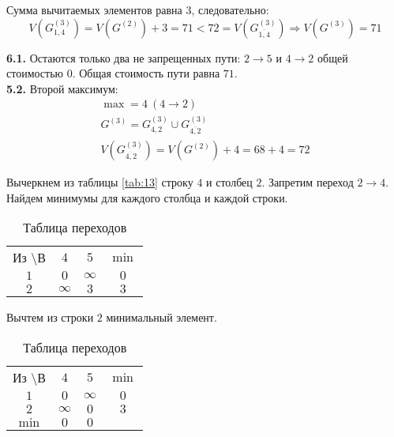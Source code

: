 Сумма вычитаемых элементов равна $3$, следовательно:
\begin{equation*}
V(G_{1,4}^{(3)}) = V(G^{(2)}) + 3 = 71 < 72 = V(G_{\overline{1,4}}^{(3)}) \Rightarrow V(G^{(3)}) = 71
\end{equation*}

\textbf{6.1.} Остаются только два не запрещенных пути: $2 \rightarrow 5$ и $4 \rightarrow 2$ общей стоимостью $0$. Общая стоимость пути равна $71$. \\

\textbf{5.2.} Второй максимум:
\begin{gather*}
\max = 4\ (4 \rightarrow 2) \\
G^{(3)} = G_{4,2}^{(3)} \cup G_{\overline{4,2}}^{(3)} \\
V(G_{\overline{4,2}}^{(3)}) = V(G^{(2)}) + 4 = 68 + 4 = 72
\end{gather*}

Вычеркнем из таблицы \ref{tab:13} строку $4$ и столбец $2$. Запретим переход $2 \rightarrow 4$. Найдем минимумы для каждого столбца и каждой строки.

\begin{table}[H]
\begin{center}
	\def\tabcolsep{15pt}
	\caption{Таблица переходов}
	\label{tab:17}
	\begin{tabular}{|c||c|c|c|}
		\hline
		Из \textbackslash В & $4$ & $5$ & $\min$ \\
		\hhline{|=#=|=|=|}
		$1$ & $0$ & $\infty$ & $0$ \\
		\hline
		$2$ & $\infty$ & $3$ & $3$ \\
		\hline
	\end{tabular}
\end{center}
\end{table}

Вычтем из строки $2$ минимальный элемент.

\begin{table}[H]
\begin{center}
	\def\tabcolsep{15pt}
	\caption{Таблица переходов}
	\label{tab:18}
	\begin{tabular}{|c||c|c|c|}
		\hline
		Из \textbackslash В & $4$ & $5$ & $\min$ \\
		\hhline{|=#=|=|=|}
		$1$ & $0$ & $\infty$ & $0$ \\
		\hline
		$2$ & $\infty$ & $0$ & $3$ \\
		\hhline{|=#=|=|=|}
		$\min$ & $0$ & $0$ & \\ 
		\hline
	\end{tabular}
\end{center}
\end{table}


